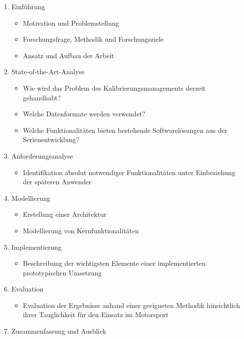 \documentclass[12pt]{article} %
\begin{document}
\begin{enumerate}
  \item Einführung
        \begin{itemize}
          \item Motivation und Problemstellung
          \item Forschungsfrage, Methodik und Forschungsziele
          \item Ansatz und Aufbau der Arbeit
        \end{itemize}

  \item State-of-the-Art-Analyse
        \begin{itemize}
          \item Wie wird das Problem des Kalibrierungsmanagements derzeit gehandhabt?
          \item Welche Datenformate werden verwendet?
          \item Welche Funktionalitäten bieten bestehende Softwarelösungen aus der Serienentwicklung?
        \end{itemize}

  \item Anforderungsanalyse
        \begin{itemize}
          \item Identifikation absolut notwendiger Funktionalitäten unter Einbeziehung der späteren Anwender
        \end{itemize}

  \item Modellierung
        \begin{itemize}
          \item Erstellung einer Architektur
          \item Modellierung von Kernfunktionalitäten
        \end{itemize}

  \item Implementierung
        \begin{itemize}
          \item Beschreibung der wichtigsten Elemente einer implementierten prototypischen Umsetzung
        \end{itemize}

  \item Evaluation
        \begin{itemize}
          \item Evaluation der Ergebnisse anhand einer geeigneten Methodik hinsichtlich ihrer Tauglichkeit für den Einsatz im Motorsport
        \end{itemize}

  \item Zusammenfassung und Ausblick
\end{enumerate}
\end{document}
